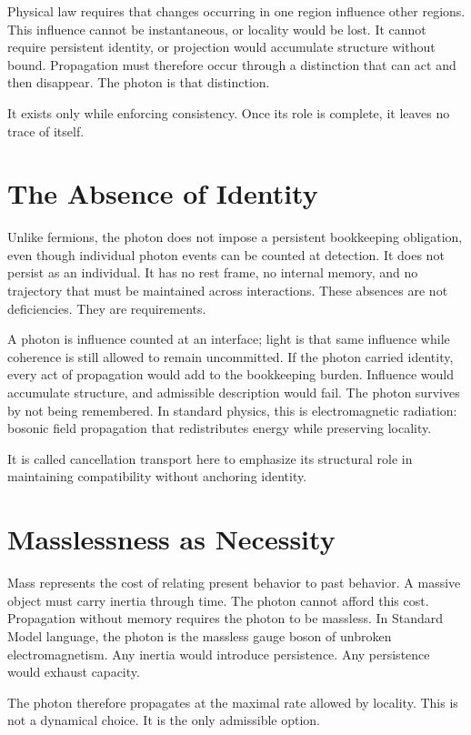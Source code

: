\documentclass[11pt,twoside,openright]{book}
\begin{document}
Physical law requires that changes occurring in one region influence other regions. This influence cannot be instantaneous, or locality would be lost. It cannot require persistent identity, or projection would accumulate structure without bound. Propagation must therefore occur through a distinction that can act and then disappear. The photon is that distinction.

It exists only while enforcing consistency. Once its role is complete, it leaves no trace of itself.

\section*{The Absence of Identity}

Unlike fermions, the photon does not impose a persistent bookkeeping obligation, even though individual photon events can be counted at detection. It does not persist as an individual. It has no rest frame, no internal memory, and no trajectory that must be maintained across interactions. These absences are not deficiencies. They are requirements.

A photon is influence counted at an interface; light is that same influence while coherence is still allowed to remain uncommitted. If the photon carried identity, every act of propagation would add to the bookkeeping burden. Influence would accumulate structure, and admissible description would fail. The photon survives by not being remembered. In standard physics, this is electromagnetic radiation: bosonic field propagation that redistributes energy while preserving locality.

It is called cancellation transport here to emphasize its structural role in maintaining compatibility without anchoring identity.

\section*{Masslessness as Necessity}

Mass represents the cost of relating present behavior to past behavior. A massive object must carry inertia through time. The photon cannot afford this cost. Propagation without memory requires the photon to be massless. In Standard Model language, the photon is the massless gauge boson of unbroken electromagnetism. Any inertia would introduce persistence. Any persistence would exhaust capacity.

The photon therefore propagates at the maximal rate allowed by locality. This is not a dynamical choice. It is the only admissible option.
\end{document}
